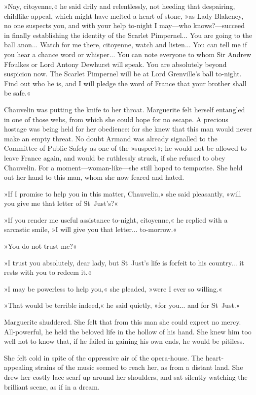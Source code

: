 »Nay, citoyenne,« he said drily and relentlessly, not heeding that despairing, childlike appeal, which might have melted a heart of stone, »as Lady Blakeney, no one suspects you, and with your help to-night I may\allowbreak---\allowbreak who knows?\allowbreak---\allowbreak succeed in finally establishing the identity of the Scarlet Pimpernel... You are going to the ball anon... Watch for me there, citoyenne, watch and listen... You can tell me if you hear a chance word or whisper... You can note everyone to whom Sir Andrew Ffoulkes or Lord Antony Dewhurst will speak. You are absolutely beyond suspicion now. The Scarlet Pimpernel will be at Lord Grenville's ball to-night. Find out who he is, and I will pledge the word of France that your brother shall be safe.«

Chauvelin was putting the knife to her throat. Marguerite felt herself entangled in one of those webs, from which she could hope for no escape. A precious hostage was being held for her obedience: for she knew that this man would never make an empty threat. No doubt Armand was already signalled to the Committee of Public Safety as one of the »suspect«; he would not be allowed to leave France again, and would be ruthlessly struck, if she refused to obey Chauvelin. For a moment\allowbreak---\allowbreak woman-like\allowbreak---\allowbreak she still hoped to temporise. She held out her hand to this man, whom she now feared and hated.

»If I promise to help you in this matter, Chauvelin,« she said pleasantly, »will you give me that letter of St~Just's?«

»If you render me useful assistance to-night, citoyenne,« he replied with a sarcastic smile, »I will give you that letter... to-morrow.«

»You do not trust me?«

»I trust you absolutely, dear lady, but St~Just's life is forfeit to his country... it rests with you to redeem it.«

»I may be powerless to help you,« she pleaded, »were I ever so willing.«

»That would be terrible indeed,« he said quietly, »for you... and for St~Just.«

Marguerite shuddered. She felt that from this man she could expect no mercy. All-powerful, he held the beloved life in the hollow of his hand. She knew him too well not to know that, if he failed in gaining his own ends, he would be pitiless.

She felt cold in spite of the oppressive air of the opera-house. The heart-appealing strains of the music seemed to reach her, as from a distant land. She drew her costly lace scarf up around her shoulders, and sat silently watching the brilliant scene, as if in a dream.

